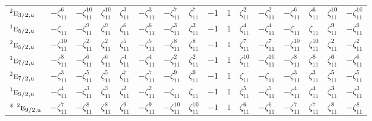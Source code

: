 \documentclass[10pt,a4paper]{article}
\numberwithin{equation}{section}
\newcommand{\irr}[1]{\text{\normalfont\scshape #1}}
\newcommand{\conjpair}[1]{{}^{#1}}
\newcommand{\ptag}[1]{\mathrm{#1}}
\newcommand{\rootunity}[1]{\zeta_{#1}}
\begin{document}
{\begin{longtable}{@{}lccccccccccccccc@{}}
$\conjpair{2}\irr{e}_{3/2,\ptag{u}}$ & $-\rootunity{11}^{6}$ & $-\rootunity{11}^{10}$ & $\rootunity{11}^{10}$ & $\rootunity{11}^{3}$ & $-\rootunity{11}^{3}$ & $-\rootunity{11}^{7}$ & $\rootunity{11}^{7}$ & $-1$ & $1$ & $\rootunity{11}^{2}$ & $-\rootunity{11}^{2}$ & $-\rootunity{11}^{6}$ & $\rootunity{11}^{6}$ & $\rootunity{11}^{10}$ & $-\rootunity{11}^{10}$\\
$\conjpair{1}\irr{e}_{5/2,\ptag{u}}$ & $-\rootunity{11}$ & $-\rootunity{11}^{9}$ & $\rootunity{11}^{9}$ & $\rootunity{11}^{6}$ & $-\rootunity{11}^{6}$ & $-\rootunity{11}^{3}$ & $\rootunity{11}^{3}$ & $-1$ & $1$ & $\rootunity{11}^{4}$ & $-\rootunity{11}^{4}$ & $-\rootunity{11}$ & $\rootunity{11}$ & $\rootunity{11}^{9}$ & $-\rootunity{11}^{9}$\\
$\conjpair{2}\irr{e}_{5/2,\ptag{u}}$ & $-\rootunity{11}^{10}$ & $-\rootunity{11}^{2}$ & $\rootunity{11}^{2}$ & $\rootunity{11}^{5}$ & $-\rootunity{11}^{5}$ & $-\rootunity{11}^{8}$ & $\rootunity{11}^{8}$ & $-1$ & $1$ & $\rootunity{11}^{7}$ & $-\rootunity{11}^{7}$ & $-\rootunity{11}^{10}$ & $\rootunity{11}^{10}$ & $\rootunity{11}^{2}$ & $-\rootunity{11}^{2}$\\
$\conjpair{1}\irr{e}_{7/2,\ptag{u}}$ & $-\rootunity{11}^{8}$ & $-\rootunity{11}^{6}$ & $\rootunity{11}^{6}$ & $\rootunity{11}^{4}$ & $-\rootunity{11}^{4}$ & $-\rootunity{11}^{2}$ & $\rootunity{11}^{2}$ & $-1$ & $1$ & $\rootunity{11}^{10}$ & $-\rootunity{11}^{10}$ & $-\rootunity{11}^{8}$ & $\rootunity{11}^{8}$ & $\rootunity{11}^{6}$ & $-\rootunity{11}^{6}$\\
$\conjpair{2}\irr{e}_{7/2,\ptag{u}}$ & $-\rootunity{11}^{3}$ & $-\rootunity{11}^{5}$ & $\rootunity{11}^{5}$ & $\rootunity{11}^{7}$ & $-\rootunity{11}^{7}$ & $-\rootunity{11}^{9}$ & $\rootunity{11}^{9}$ & $-1$ & $1$ & $\rootunity{11}$ & $-\rootunity{11}$ & $-\rootunity{11}^{3}$ & $\rootunity{11}^{3}$ & $\rootunity{11}^{5}$ & $-\rootunity{11}^{5}$\\
$\conjpair{1}\irr{e}_{9/2,\ptag{u}}$ & $-\rootunity{11}^{4}$ & $-\rootunity{11}^{3}$ & $\rootunity{11}^{3}$ & $\rootunity{11}^{2}$ & $-\rootunity{11}^{2}$ & $-\rootunity{11}$ & $\rootunity{11}$ & $-1$ & $1$ & $\rootunity{11}^{5}$ & $-\rootunity{11}^{5}$ & $-\rootunity{11}^{4}$ & $\rootunity{11}^{4}$ & $\rootunity{11}^{3}$ & $-\rootunity{11}^{3}$\\*
$\conjpair{2}\irr{e}_{9/2,\ptag{u}}$ & $-\rootunity{11}^{7}$ & $-\rootunity{11}^{8}$ & $\rootunity{11}^{8}$ & $\rootunity{11}^{9}$ & $-\rootunity{11}^{9}$ & $-\rootunity{11}^{10}$ & $\rootunity{11}^{10}$ & $-1$ & $1$ & $\rootunity{11}^{6}$ & $-\rootunity{11}^{6}$ & $-\rootunity{11}^{7}$ & $\rootunity{11}^{7}$ & $\rootunity{11}^{8}$ & $-\rootunity{11}^{8}$\\
\bottomrule\end{longtable}}
\end{document}
